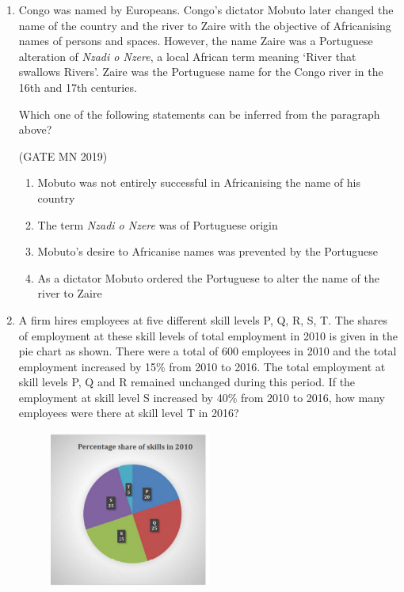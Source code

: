 \documentclass[journal]{IEEEtran}
\begin{document}
\begin{enumerate}
	\hfill(GATE MN 2019)
\begin{multicols}{4}
\begin{enumerate}
\item 9 : 16  
\item 11 : 14  
\item 37 : 63  
\item 47 : 53  
\end{enumerate}
\end{multicols}


\item Congo was named by Europeans. Congo’s dictator Mobuto later changed the name of the country and the river to Zaire with the objective of Africanising names of persons and spaces. However, the name Zaire was a Portuguese alteration of \textit{Nzadi o Nzere}, a local African term meaning ‘River that swallows Rivers’. Zaire was the Portuguese name for the Congo river in the 16th and 17th centuries.  

Which one of the following statements can be inferred from the paragraph above?

\hfill(GATE MN 2019)
\begin{enumerate}
\item Mobuto was not entirely successful in Africanising the name of his country  
\item The term \textit{Nzadi o Nzere} was of Portuguese origin  
\item Mobuto’s desire to Africanise names was prevented by the Portuguese  
\item As a dictator Mobuto ordered the Portuguese to alter the name of the river to Zaire  
\end{enumerate}

\item A firm hires employees at five different skill levels P, Q, R, S, T. 
The shares of employment at these skill levels of total employment in 2010 is given in the pie chart as shown. 
There were a total of 600 employees in 2010 and the total employment increased by 15\% from 2010 to 2016. 
The total employment at skill levels P, Q and R remained unchanged during this period. 
If the employment at skill level S increased by 40\% from 2010 to 2016, how many employees were there at skill level T in 2016?


\begin{figure}[H]                                
\centering
\includegraphics[width=0.5\textwidth]{Screenshot_2025_0818_124252.png}
\caption{}                                     
\label{fig:Q9}                             
\end{figure}



\end{enumerate}
\end{document}
